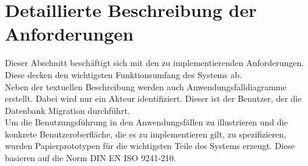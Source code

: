 \section{Detaillierte Beschreibung der Anforderungen}
\label{sec:af}
Dieser Abschnitt beschäftigt sich mit den zu implementierenden Anforderungen. Diese decken den wichtigsten Funktionsumfang des Systems ab.\\
Neben der textuellen Beschreibung werden auch Anwendungsfalldiagramme erstellt. Dabei wird nur ein Akteur identifiziert. Dieser ist der Benutzer, der die Datenbank Migration durchführt. \\
Um die Benutzungsführung in den Anwendungsfällen zu illustrieren und die konkrete Benutzeroberfläche, die es zu implementieren gilt, zu spezifizieren, wurden Papierprototypen für die wichtigsten Teile des Systems erzeugt. Diese basieren  auf die Norm DIN EN ISO 9241-210.





